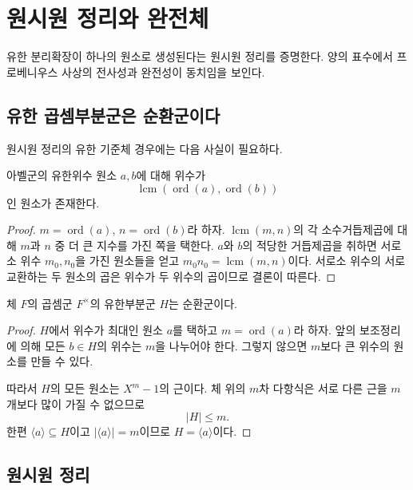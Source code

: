 \clearpage
\section{원시원 정리와 완전체}
\label{sec:primitive-perfect}

\begin{learninggoal}
유한 분리확장이 하나의 원소로 생성된다는 원시원 정리를 증명한다. 양의 표수에서 프로베니우스 사상의 전사성과 완전성이 동치임을 보인다.
\end{learninggoal}

\subsection{유한 곱셈부분군은 순환군이다}

원시원 정리의 유한 기준체 경우에는 다음 사실이 필요하다.

\begin{lemma}
아벨군의 유한위수 원소 $a,b$에 대해 위수가
\[
  \operatorname{lcm}(\operatorname{ord}(a),\operatorname{ord}(b))
\]
인 원소가 존재한다.
\end{lemma}

\begin{proof}
$m=\operatorname{ord}(a)$, $n=\operatorname{ord}(b)$라 하자. $\operatorname{lcm}(m,n)$의 각 소수거듭제곱에 대해 $m$과 $n$ 중 더 큰 지수를 가진 쪽을 택한다. $a$와 $b$의 적당한 거듭제곱을 취하면 서로소 위수 $m_0,n_0$을 가진 원소들을 얻고 $m_0n_0=\operatorname{lcm}(m,n)$이다. 서로소 위수의 서로 교환하는 두 원소의 곱은 위수가 두 위수의 곱이므로 결론이 따른다.
\end{proof}

\begin{proposition}
체 $F$의 곱셈군 $F^\times$의 유한부분군 $H$는 순환군이다.
\end{proposition}

\begin{proof}
$H$에서 위수가 최대인 원소 $a$를 택하고 $m=\operatorname{ord}(a)$라 하자. 앞의 보조정리에 의해 모든 $b\in H$의 위수는 $m$을 나누어야 한다. 그렇지 않으면 $m$보다 큰 위수의 원소를 만들 수 있다.

따라서 $H$의 모든 원소는 $X^m-1$의 근이다. 체 위의 $m$차 다항식은 서로 다른 근을 $m$개보다 많이 가질 수 없으므로
\[
  |H|\le m.
\]
한편 $\langle a\rangle\subseteq H$이고 $|\langle a\rangle|=m$이므로 $H=\langle a\rangle$이다.
\end{proof}

\subsection{원시원 정리}

